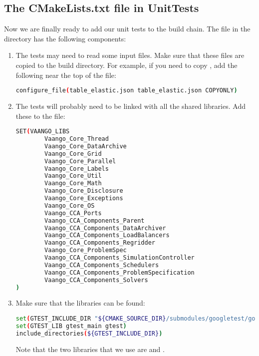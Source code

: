 \subsection{The CMakeLists.txt file in UnitTests}
Now we are finally ready to add our unit tests to the build chain.  The 
 file in the  directory has the 
following components:
\begin{enumerate}
  \item The tests may need to read some input files.  Make sure that these files
        are copied to the build directory.  For example, if you need to copy
        , add the following near the top of
        the  file:
\begin{lstlisting}[language=sh, backgroundcolor=\color{background}]
configure_file(table_elastic.json table_elastic.json COPYONLY)
\end{lstlisting}

  \item The tests will probably need to be linked with all the \Vaango shared
        libraries.  Add these to the  file:
\begin{lstlisting}[language=sh, backgroundcolor=\color{background}]
SET(VAANGO_LIBS 
        Vaango_Core_Thread       
        Vaango_Core_DataArchive 
        Vaango_Core_Grid        
        Vaango_Core_Parallel    
        Vaango_Core_Labels      
        Vaango_Core_Util        
        Vaango_Core_Math        
        Vaango_Core_Disclosure  
        Vaango_Core_Exceptions  
        Vaango_Core_OS  
        Vaango_CCA_Ports        
        Vaango_CCA_Components_Parent 
        Vaango_CCA_Components_DataArchiver  
        Vaango_CCA_Components_LoadBalancers 
        Vaango_CCA_Components_Regridder     
        Vaango_Core_ProblemSpec             
        Vaango_CCA_Components_SimulationController 
        Vaango_CCA_Components_Schedulers           
        Vaango_CCA_Components_ProblemSpecification 
        Vaango_CCA_Components_Solvers
)
\end{lstlisting}

  \item Make sure that the  libraries can be found:
\begin{lstlisting}[language=sh, backgroundcolor=\color{background}]
set(GTEST_INCLUDE_DIR "${CMAKE_SOURCE_DIR}/submodules/googletest/googletest/include")
set(GTEST_LIB gtest_main gtest)
include_directories(${GTEST_INCLUDE_DIR})
\end{lstlisting}
        Note that the two  libraries that we use are 
         and .


\end{enumerate}
